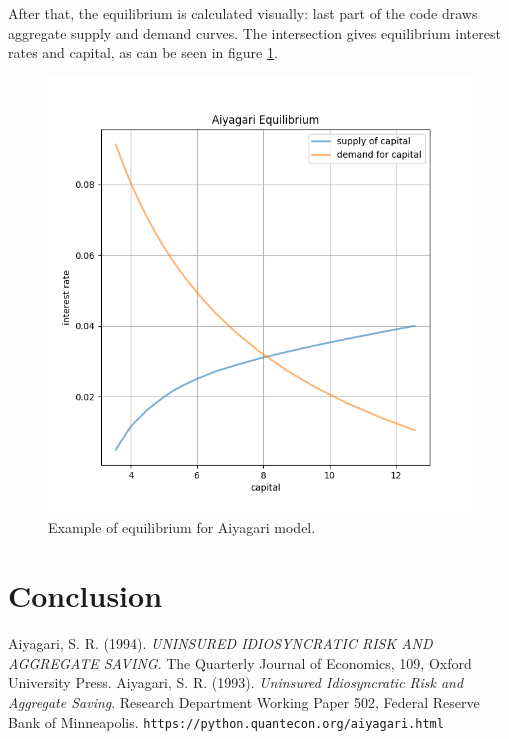 \documentclass[12pt]{article}
\begin{document}
After that, the equilibrium is calculated visually: last part of the code draws aggregate supply and demand curves. The intersection gives equilibrium interest rates and capital, as can be seen in figure \ref{plot:equilibrium}.
\begin{figure}[]
\label{plot:equilibrium}
\centering
\includegraphics[scale = 0.8]{equilibrium.png}
\caption{Example of equilibrium for Aiyagari model.}
\end{figure}


\newpage
\section{Conclusion}

\listoffigures

\newpage
\begin{thebibliography}{99}
 {\sc Aiyagari, S. R.} (1994). \textit{UNINSURED IDIOSYNCRATIC RISK AND AGGREGATE SAVING}. The Quarterly Journal of Economics, 109, Oxford University Press.
 {\sc Aiyagari, S. R.} (1993). \textit{Uninsured Idiosyncratic Risk and Aggregate Saving}. Research Department Working Paper 502, Federal Reserve Bank of Minneapolis.
 \texttt{https://python.quantecon.org/aiyagari.html}
\end{thebibliography}
\end{document}
